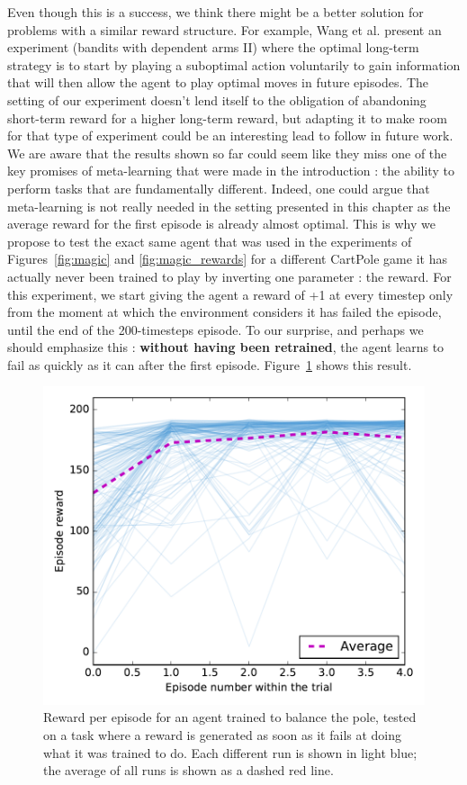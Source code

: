 Even though this is a success, we think there might be a better solution for
problems with a similar reward structure. For example, Wang et al.
\cite{learningtorl} present an experiment (bandits with dependent arms II) 
where the optimal long-term strategy is to start by playing a suboptimal action
voluntarily to gain information that will then allow the agent to play
optimal moves in future episodes. The setting of our experiment doesn't lend
itself to the obligation of abandoning short-term reward for a higher long-term
reward, but adapting it to make room for that type of experiment could be
an interesting lead to follow in future work.\\

We are aware that the results shown so far could seem like they miss one 
of the key promises of meta-learning that were made in the introduction :
the ability to perform tasks that are fundamentally different. Indeed,
one could argue that meta-learning is not really needed in the setting
presented in this chapter as the average reward for the first episode is 
already almost optimal. This is why we propose to test the exact same agent
that was used in the experiments of Figures~\ref{fig:magic} and 
\ref{fig:magic_rewards} for a different CartPole game it has 
actually never been trained to play by inverting one parameter : the reward.
For this experiment, we start giving the agent a reward of +1 at every timestep
only from the moment at which the environment considers it has failed the
episode, until the end of the 200-timesteps episode. 
To our surprise, and perhaps we should emphasize this : 
\textbf{without having been retrained}, the agent learns to fail as quickly
as it can after the first episode. Figure~\ref{fig:magic_magic} shows this
result.

\begin{figure}
	\centering
	\includegraphics[width=0.8\linewidth]{fig/magic_magic.pdf}
	\caption{Reward per episode for an agent trained to balance the pole,
	tested on a task where a reward is generated as soon as it fails at
	doing what it was trained to do. Each different run is shown in light
	blue; the average of all runs is shown as a dashed red line.}
	\label{fig:magic_magic}
\end{figure}


